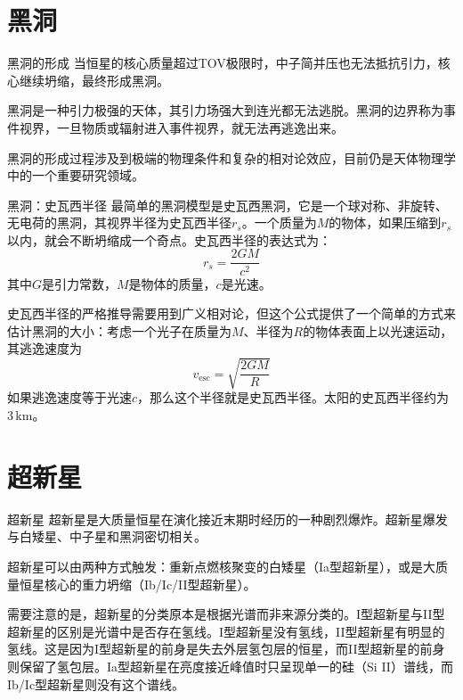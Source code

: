 \documentclass[10pt,aspectratio=1610]{beamer}
\begin{document}
\section{黑洞}

\begin{frame}{黑洞的形成}
    当恒星的核心质量超过TOV极限时，中子简并压也无法抵抗引力，核心继续坍缩，最终形成\textcolor{dia}{黑洞}。

    黑洞是一种引力极强的天体，其引力场强大到连光都无法逃脱。黑洞的边界称为\textcolor{dia}{事件视界}，\textcolor{mari}{一旦物质或辐射进入事件视界，就无法再逃逸出来}。

    黑洞的形成过程涉及到极端的物理条件和复杂的相对论效应，目前仍是天体物理学中的一个重要研究领域。
\end{frame}

\begin{frame}{黑洞：史瓦西半径}
    最简单的黑洞模型是\textcolor{dia}{史瓦西黑洞}，它是一个球对称、非旋转、无电荷的黑洞，其视界半径为\textcolor{dia}{史瓦西半径$r_s$}。一个质量为$M$的物体，如果压缩到$r_s$以内，就会不断坍缩成一个奇点。史瓦西半径的表达式为：
    \textcolor{dia}{
    \[
        r_s = \frac{2GM}{c^2}
    \]
    }
    其中$G$是引力常数，$M$是物体的质量，$c$是光速。

    史瓦西半径的严格推导需要用到广义相对论，但这个公式提供了一个简单的方式来估计黑洞的大小：考虑一个光子在质量为$M$、半径为$R$的物体表面上以光速运动，其逃逸速度为
    \[
        v_\mathrm{esc} = \sqrt{\frac{2GM}{R}}
    \]
    \textcolor{mari}{如果逃逸速度等于光速$c$，那么这个半径就是史瓦西半径}。太阳的史瓦西半径约为$3\,\mathrm{km}$。
\end{frame}

\section{超新星}

\begin{frame}{超新星}
    \textcolor{dia}{超新星}是大质量恒星在演化接近末期时经历的一种剧烈爆炸。超新星爆发与白矮星、中子星和黑洞密切相关。

    超新星可以由两种方式触发：\textcolor{mari}{重新点燃核聚变的白矮星（Ia型超新星），或是大质量恒星核心的重力坍缩（Ib/Ic/II型超新星）}。

    需要注意的是，超新星的分类原本是根据\textcolor{mari}{光谱}而非来源分类的。I型超新星与II型超新星的区别是光谱中\textcolor{mari}{是否存在氢线}。I型超新星没有氢线，II型超新星有明显的氢线。这是因为I型超新星的前身是失去外层氢包层的恒星，而II型超新星的前身则保留了氢包层。Ia型超新星在亮度接近峰值时只呈现单一的硅（Si II）谱线，而Ib/Ic型超新星则没有这个谱线。
\end{frame}
\end{document}

